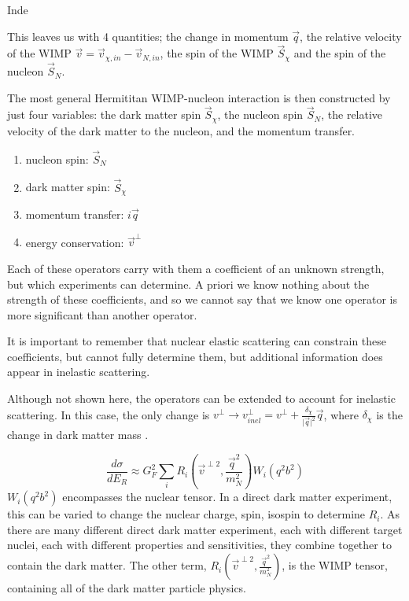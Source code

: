 \par
Inde

This leaves us with 4 quantities; the change in momentum $\vec{q}$, the relative velocity of the WIMP $\vec{v}=\vec{v}_{\chi,in} - \vec{v}_{N,in}$, the spin of the WIMP $\vec{S}_{\chi}$ and the spin of the nucleon $\vec{S}_{N}$.


\par
The most general Hermititan WIMP-nucleon interaction is then constructed by just four variables: the dark matter spin $\Vec{S}_{\chi}$, the nucleon spin $\Vec{S}_{N}$, the relative velocity of the dark matter to the nucleon, and the momentum transfer.
\begin{enumerate}
    \item nucleon spin: $\Vec{S}_{N}$
    \item dark matter spin: $\Vec{S}_{\chi}$
    \item momentum transfer: $i\Vec{q}$
    \item energy conservation: $\Vec{v}^{\bot}$
\end{enumerate}
\par
Each of these operators carry with them a coefficient of an unknown strength, but which experiments can determine.
A priori we know nothing about the strength of these coefficients, and so we cannot say that we know one operator is more significant than another operator.

\par
It is important to remember that nuclear elastic scattering can constrain these coefficients, but cannot fully determine them, but additional information does appear in inelastic scattering.





\par
Although not shown here, the operators can be extended to account for inelastic scattering.
In this case, the only change is $v^{\perp} \rightarrow v_{inel}^{\perp}=v^{\perp} + \frac{\delta_\chi}{\vert\vec{q}\vert^2}\vec{q}$, where $\delta_\chi$ is the change in dark matter mass \cite{inelastics_eft_ref}.


\begin{equation}
    \frac{d\sigma}{dE_R} \approx G_F^2 \sum_{i} R_i (\vec{v}^{\perp 2}, \frac{\vec{q}^2}{m_N^2}) W_i(q^2b^2)
\end{equation}
$W_i(q^2b^2)$ encompasses the nuclear tensor.
In a direct dark matter experiment, this can be varied to change the nuclear charge, spin, isospin to determine $R_i$.
As there are many different direct dark matter experiment, each with different target nuclei, each with different properties and sensitivities, they combine together to contain the dark matter.
The other term, $R_i (\vec{v}^{\perp 2}, \frac{\vec{q}^2}{m_N^2})$, is the WIMP tensor, containing all of the dark matter particle physics.







